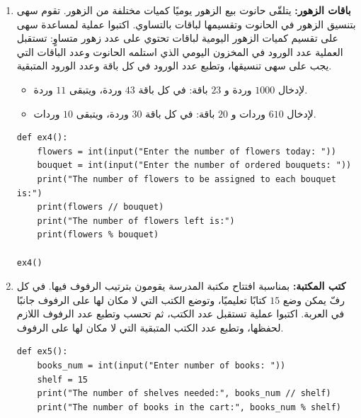 \documentclass[14pt]{extarticle}
\begin{document}
\begin{enumerate}[label=\textbf{تمرين \arabic*:}, wide=0pt, itemsep=2.2em]
\item \textbf{باقات الزهور:} يتلقّى حانوت بيع الزهور يوميًا كميات مختلفة من الزهور. تقوم سهى بتنسيق الزهور في الحانوت وتقسيمها لباقات بالتساوي.
اكتبوا عملية لمساعدة سهى على تقسيم كميات الزهور اليومية لباقات تحتوي على عدد زهور متساوٍ: تستقبل العملية عدد الورود في المخزون اليومي الذي استلمه الحانوت وعدد الباقات التي يجب على سهى تنسيقها، وتطبع عدد الورود في كل باقة وعدد الورود المتبقية.

\ifdetailed
\begin{boxExample}
\begin{itemize}
\item لإدخال $1000$ وردة و $23$ باقة: في كل باقة $43$ وردة، ويتبقى $11$ وردة.
\item لإدخال $610$ وردات و $20$ باقة: في كل باقة $30$ وردة، ويتبقى $10$ وردات.
\end{itemize}
\end{boxExample}
\fi

\ifwithsols
\begin{boxSolution}
\begin{english}
\begin{verbatim}
def ex4():
    flowers = int(input("Enter the number of flowers today: "))
    bouquet = int(input("Enter the number of ordered bouquets: "))
    print("The number of flowers to be assigned to each bouquet is:")
    print(flowers // bouquet)
    print("The number of flowers left is:")
    print(flowers % bouquet)

ex4()
\end{verbatim}
\end{english}
\end{boxSolution}
\fi
\filbreak

\item \textbf{كتب المكتبة:} بمناسبة افتتاح مكتبة المدرسة يقومون بترتيب الرفوف فيها. في كل رفّ يمكن وضع $15$ كتابًا تعليميًا، وتوضع الكتب التي لا مكان لها على الرفوف جانبًا في العربة.
اكتبوا عملية تستقبل عدد الكتب، ثم تحسب وتطبع عدد الرفوف اللازم لحفظها، وتطبع عدد الكتب المتبقية التي لا مكان لها على الرفوف.

\ifwithsols
\begin{boxSolution}
\begin{english}
\begin{verbatim}
def ex5():
    books_num = int(input("Enter number of books: "))
    shelf = 15
    print("The number of shelves needed:", books_num // shelf)
    print("The number of books in the cart:", books_num % shelf)


\end{verbatim}
\end{english}
\end{boxSolution}
\end{enumerate}
\end{document}
